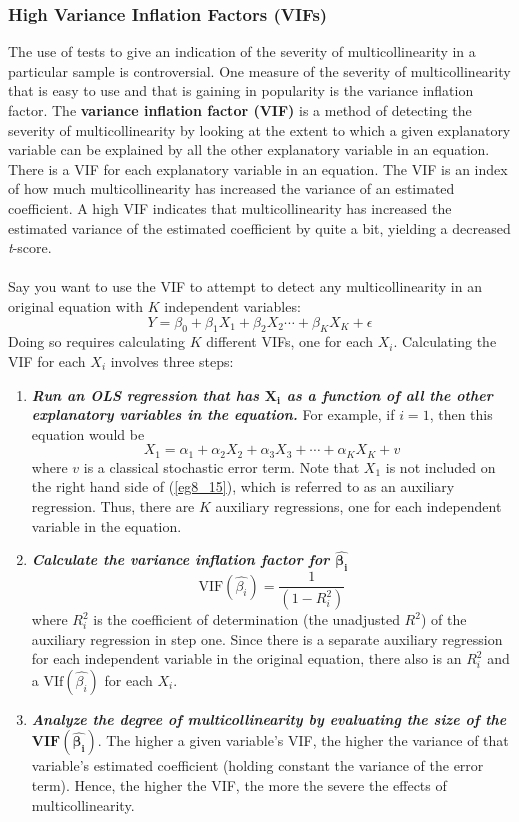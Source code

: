 \documentclass[11pt]{article}
\begin{document}
\subsubsection{High Variance Inflation Factors (VIFs)}
The use of tests to give an indication of the severity of multicollinearity in a particular sample is controversial. One measure of the severity of multicollinearity that is easy to use and that is gaining in popularity is the variance inflation factor. The \textbf{variance inflation factor (VIF)} is a method of detecting the severity of multicollinearity by looking at the extent to which a given explanatory variable can be explained by all the other explanatory variable in an equation. There is a VIF for each explanatory variable in an equation. The VIF is an index of how much multicollinearity has increased the variance of an estimated coefficient. A high VIF indicates that multicollinearity has increased the estimated variance of the estimated coefficient by quite a bit, yielding a decreased \textit{t}-score.\\ \\
Say you want to use the VIF to attempt to detect any multicollinearity in an original equation with $K$ independent variables:
$$
Y = \beta_0 + \beta_1X_1 + \beta_2X_2 \cdots + \beta_KX_K + \epsilon
$$
Doing so requires calculating $K$ different VIFs, one for each $X_i$. Calculating the VIF for each $X_i$ involves three steps:
\begin{enumerate}
\item \textit{\textbf{Run an OLS regression that has $\boldsymbol{X_i}$ as a function of all the other explanatory variables in the equation.}} For example, if $i=1$, then this equation would be
\begin{equation}
X_1 = \alpha_1 + \alpha_2X_2  + \alpha_3X_3 + \cdots + \alpha_KX_K + v \label{eg8_15}
\end{equation}
where $v$ is a classical stochastic error term. Note that $X_1$ is not included on the right hand side of (\ref{eg8_15}), which is referred to as an auxiliary regression. Thus, there are $K$ auxiliary regressions, one for each independent variable in the equation.
\item \textit{\textbf{Calculate the variance inflation factor for $\hat{\boldsymbol{\beta_i}}$}}
\begin{equation}
\text{VIF}(\hat{\beta_i}) = \frac 1 {(1-R_i^2)} \label{eg8_16}
\end{equation}
where $R_i^2$ is the coefficient of determination (the unadjusted $R^2$) of the auxiliary regression in step one. Since there is a separate auxiliary regression for each independent variable in the original equation, there also is an $R_i^2$ and a $\text{VIf}(\hat{\beta_i})$ for each $X_i$.
\item \textbf{\textit{Analyze the degree of multicollinearity by evaluating the size of the $\boldsymbol{VIF(\hat{\beta_i})}$}}. The higher a given variable's VIF, the higher the variance of that variable's estimated coefficient (holding constant the variance of the error term). Hence, the higher the VIF, the more the severe the effects of multicollinearity.
\end{enumerate}
\end{document}
